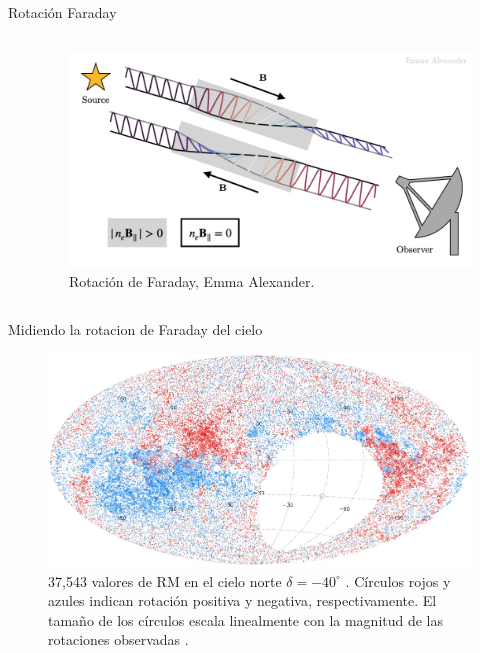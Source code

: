 \documentclass[xetex,aspectratio=169]{beamer}
\begin{document}
\begin{frame}{Rotación Faraday}
\begin{columns}
\begin{column}{0.55\textwidth}
				
			\end{column}
			
			\begin{column}{0.45\textwidth}
				\begin{figure}
					\centering
					\includegraphics[width=\textwidth, height=\textheight, keepaspectratio]{figures/faraday_rotation/faraday_rot.png}
					\caption*{Rotación de Faraday, Emma Alexander.}
				\end{figure}
			\end{column}
		\end{columns}
		
	\end{frame}
	
	\begin{frame}{Midiendo la rotacion de Faraday del cielo}
		\begin{figure}
			\centering
			\includegraphics[width=.8\textwidth, keepaspectratio]{./figures/faraday_rotation/taylor.jpg}
			\caption*{37,543 valores de RM en el cielo norte $\delta = -40^\circ$ . Círculos rojos y azules indican rotación positiva y negativa, respectivamente. El tamaño de los círculos escala linealmente con la magnitud de las rotaciones observadas {\protect\autocite{Taylor-2009}}.}
		\end{figure}
	\end{frame}
	
\end{document}
